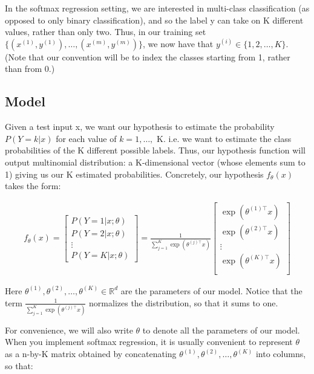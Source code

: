 In the softmax regression setting, we are interested in multi-class classification (as opposed to only binary classification), and so the label y can take on K different values, rather than only two. Thus, in our training set $\{ (x^{(1)}, y^{(1)}), \ldots, (x^{(m)}, y^{(m)}) \}$, we now have that $y^{(i)} \in \{1, 2, \ldots, K\}$. (Note that our convention will be to index the classes starting from 1, rather than from 0.) 

\subsection{Model}

Given a test input x, we want our hypothesis to estimate the probability $P(Y=k | x)$ for each value of $k = 1, \ldots,$ K. i.e. we want to estimate the class probabilities of the K different possible labels. Thus, our hypothesis function will output multinomial distribution: a K-dimensional vector (whose elements sum to 1) giving us our K estimated probabilities. Concretely, our hypothesis $f_{\theta}(x)$ takes the form:

\begin{align}
	f_\theta(x)
	=
	\begin{bmatrix}
		P(Y = 1 | x; \theta) \\ P(Y = 2 | x; \theta) \\ \vdots \\ P(Y = K | x; \theta) 
	\end{bmatrix} 
	= 
	\frac{1}{ \sum_{j=1}^{K}{\exp(\theta^{(j)\top} x) }} 
	\begin{bmatrix} 
		\exp(\theta^{(1)\top} x ) \\ \exp(\theta^{(2)\top} x ) \\ \vdots \\ \exp(\theta^{(K)\top} x ) \\ 
	\end{bmatrix} 
\end{align}

Here $\theta^{(1)}, \theta^{(2)}, \ldots, \theta^{(K)} \in \mathbb{R}^{d}$ are the parameters of our model. Notice that the term $\frac{1}{ \sum_{j=1}^{K}{\exp(\theta^{(j)\top} x) } }$ normalizes the distribution, so that it sums to one.

For convenience, we will also write $\theta$ to denote all the parameters of our model. When you implement softmax regression, it is usually convenient to represent $\theta$ as a n-by-K matrix obtained by concatenating $\theta^{(1)}, \theta^{(2)}, \ldots, \theta^{(K)}$ into columns, so that:


